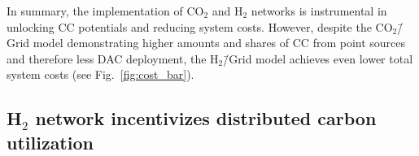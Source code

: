 \documentclass[twocolumn]{article}
\newcommand{\COtwo}{CO$_2$}
\newcommand{\Htwo}{H$_2$}
\newcommand{\modBase}{Baseline model}
\newcommand{\modCO}{CO$_2$\=/Grid model}
\newcommand{\modH}{H$_2$\=/Grid model}
\begin{document}
In summary, the implementation of \COtwo{} and \Htwo{} networks is instrumental in unlocking CC potentials and reducing system costs. However, despite the \modCO{} demonstrating higher amounts and shares of CC from point sources and therefore less DAC deployment, the \modH{} achieves even  lower total system costs (see Fig.~\ref{fig:cost_bar}).






\subsection*{\Htwo{} network incentivizes distributed carbon utilization}\label{subsec:H2}
\end{document}
